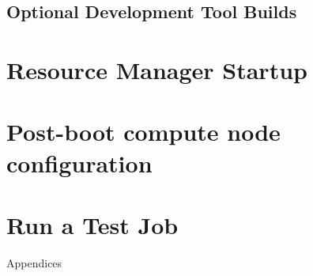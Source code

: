 \documentclass[letterpaper]{article}
\begin{document}
\subsection{Optional Development Tool Builds} \label{sec:3rdparty_intel}


\clearpage
\section{Resource Manager Startup} \label{sec:rms_startup}


\section{Post-boot compute node configuration} \label{sec:post_boot}


\section{Run a Test Job} \label{sec:test_job}


\clearpage
\appendix
{\bf \LARGE \centerline{Appendices}} \vspace*{0.2cm}

\renewcommand{\thesubsection}{\Alph{subsection}}







\end{document}
